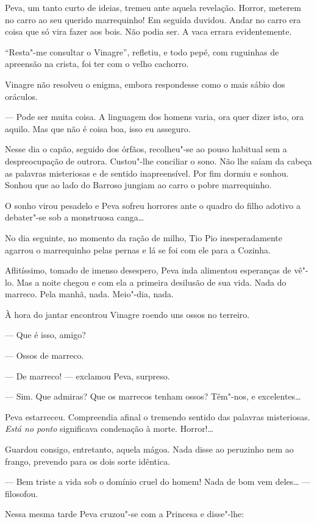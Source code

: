 Peva, um tanto curto de ideias, tremeu ante aquela revelação. Horror,
meterem no carro ao seu querido marrequinho! Em seguida duvidou. Andar
no carro era coisa que só vira fazer aos bois. Não podia ser. A vaca
errara evidentemente.

``Resta"-me consultar o Vinagre'', refletiu, e todo pepé, com ruguinhas
de apreensão na crista, foi ter com o velho cachorro.

Vinagre não resolveu o enigma, embora respondesse como o mais sábio dos
oráculos.

--- Pode ser muita coisa. A linguagem dos homens varia, ora quer dizer
isto, ora aquilo. Mas que não é coisa boa, isso eu asseguro.

Nesse dia o capão, seguido dos órfãos, recolheu"-se ao pouso habitual sem
a despreocupação de outrora. Custou"-lhe conciliar o sono. Não lhe saíam
da cabeça as palavras misteriosas e de sentido inapreensível. Por fim
dormiu e sonhou. Sonhou que ao lado do Barroso jungiam ao carro o pobre
marrequinho.

O sonho virou pesadelo e Peva sofreu horrores ante o quadro do filho
adotivo a debater"-se sob a monstruosa canga\ldots{}

No dia seguinte, no momento da ração de milho, Tio Pio inesperadamente
agarrou o marrequinho pelas pernas e lá se foi com ele para a Cozinha.

Aflitíssimo, tomado de imenso desespero, Peva inda alimentou esperanças
de vê"-lo. Mas a noite chegou e com ela a primeira desilusão de sua vida.
Nada do marreco. Pela manhã, nada. Meio"-dia, nada.

À hora do jantar encontrou Vinagre roendo uns ossos no terreiro.

--- Que é isso, amigo?

--- Ossos de marreco.

--- De marreco! --- exclamou Peva, surpreso.

--- Sim. Que admiras? Que os marrecos tenham ossos? Têm"-nos, e
excelentes\ldots{}

Peva estarreceu. Compreendia afinal o tremendo sentido das palavras
misteriosas. \emph{Está no ponto} significava condenação à morte.
Horror!\ldots{}

Guardou consigo, entretanto, aquela mágoa. Nada disse ao peruzinho nem
ao frango, prevendo para os dois sorte idêntica.

--- Bem triste a vida sob o domínio cruel do homem! Nada de bom vem
deles\ldots{} --- filosofou.

Nessa mesma tarde Peva cruzou"-se com a Princesa e disse"-lhe:

